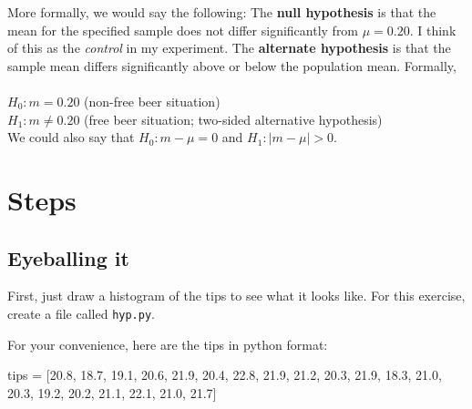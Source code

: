 \begin{fullwidth}
More formally, we would say the following: The {\bf null hypothesis} is that the mean for the specified sample does not differ significantly from $\mu = 0.20$.  I think of this as the {\em control} in my experiment. The {\bf alternate hypothesis} is that the sample mean differs significantly above or below the population mean.  Formally,\\
~\\
$H_0: m = 0.20$ (non-free beer situation)\\
$H_1: m \neq 0.20$ (free beer situation; two-sided alternative hypothesis)\\

\noindent We could also say that $H_0: m - \mu = 0$ and $H_1: |m-\mu| > 0$.

\section{Steps}

\subsection{Eyeballing it}

\step First, just draw a histogram of the tips to see what it looks like. For this exercise, create a file called {\tt hyp.py}.


For your convenience, here are the tips in python format:

\begin{pyverbatim}
tips = [20.8, 18.7, 19.1, 20.6, 21.9, 20.4, 22.8,
        21.9, 21.2, 20.3, 21.9, 18.3, 21.0, 20.3,
        19.2, 20.2, 21.1, 22.1, 21.0, 21.7]
\end{pyverbatim}


\end{fullwidth}

